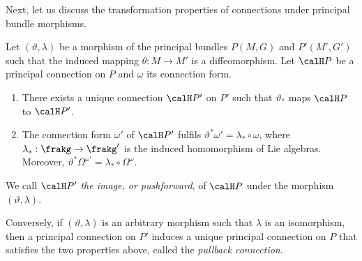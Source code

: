 Next, let us discuss the transformation properties of connections under principal bundle morphisms.

\begin{prop}[{{\cite[Props.~1.3.13, 1.3.15]{RS2}}}]\label{prop 1.3.13/15 RS2}
    Let $(\vartheta,\lambda)$ be a morphism of the principal bundles $P(M,G)$ and $P'(M',G')$ such that the induced mapping $\theta:M\to M'$ is a diffeomorphism. Let $\calH P$ be a principal connection on $P$ and $\omega$ its connection form.
    \begin{enumerate}
        \item There exists a unique connection $\calH P'$ on $P'$ such that $\vartheta_\ast$ maps $\calH P$ to $\calH P'$.
        \item The connection form $\omega'$ of $\calH P'$ fulfils $\vartheta^\ast\omega'=\lambda_{\ast}\circ \omega$, where $\lambda_\ast:\frakg\to \frakg'$ is the induced homomorphism of Lie algebras. Moreover, $\vartheta^\ast\Omega^{\omega'}=\lambda_\ast\circ\Omega^\omega$.
    \end{enumerate}
    We call $\calH P'$ \emph{the image, or pushforward}, of $\calH P$ under the morphism $(\vartheta,\lambda)$. 

    Conversely, if $(\vartheta,\lambda)$ is an arbitrary morphism such that $\lambda$ is an isomorphism, then a principal connection on $P'$ induces a unique principal connection on $P$ that satisfies the two properties above, called the \emph{pullback connection}.
\end{prop}
